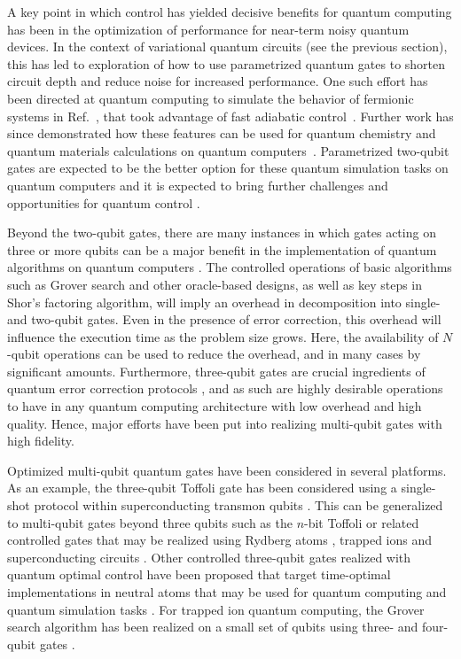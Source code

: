 A key point in which control has yielded decisive benefits for quantum computing has been in the optimization of performance for near-term noisy quantum devices. In the context of variational quantum circuits (see the previous section), this has led to exploration of how to use parametrized quantum gates to shorten circuit depth and reduce noise for increased performance. One such effort has been directed at quantum computing to simulate the behavior of fermionic systems in Ref.~\cite{barends2015digital}, that took advantage of fast adiabatic control~\cite{martinis2014fast}. Further work has since demonstrated how these features can be used for quantum chemistry and quantum materials calculations on quantum computers~\cite{ganzhorn2019gate, foxen2020demonstrating}. Parametrized two-qubit gates are expected to be the better option for these quantum simulation tasks on quantum computers \cite{lacroix2020improving,rasmussen2022parameterized} and it is expected to bring further challenges and opportunities for quantum control \cite{shi2020resource}.

Beyond the two-qubit gates, there are many instances in which gates acting on three or more qubits can be a major benefit in the implementation of quantum algorithms on quantum computers \cite{shi2020resource}. The controlled operations of basic algorithms such as Grover search and other oracle-based designs, as well as key steps in Shor's factoring algorithm, will imply an overhead in decomposition into single- and two-qubit gates. Even in the presence of error correction, this overhead will influence the execution time as the problem size grows. Here, the availability of $N$-qubit operations can be used to reduce the overhead, and in many cases by significant amounts. Furthermore, three-qubit gates are crucial ingredients of quantum error correction protocols \cite{nielsen2010quantum}, and as such are highly desirable operations to have in any quantum computing architecture with low overhead and high quality. Hence, major efforts have been put into realizing multi-qubit gates with high fidelity.

Optimized multi-qubit quantum gates have been considered in several platforms. As an example, the three-qubit Toffoli gate has been considered using a single-shot protocol within superconducting transmon qubits \cite{zahedinejad2015high}. This can be generalized to multi-qubit gates beyond three qubits such as the $n$-bit Toffoli or related controlled gates that may be realized using Rydberg atoms \cite{khazali2020fast}, trapped ions \cite{rasmussen2020single} and superconducting circuits \cite{khazali2020fast,rasmussen2020single,warren2023extensive}. Other controlled three-qubit gates realized with quantum optimal control have been proposed that target time-optimal implementations \cite{jandura2022time} in neutral atoms that may be used for quantum computing \cite{henriet2020quantum} and quantum simulation tasks \cite{morgado2021quantum} .
For trapped ion quantum computing, the Grover search algorithm has been realized on a small set of qubits \cite{figgatt2017complete} using three- and four-qubit gates \cite{katz2023demonstration}.

